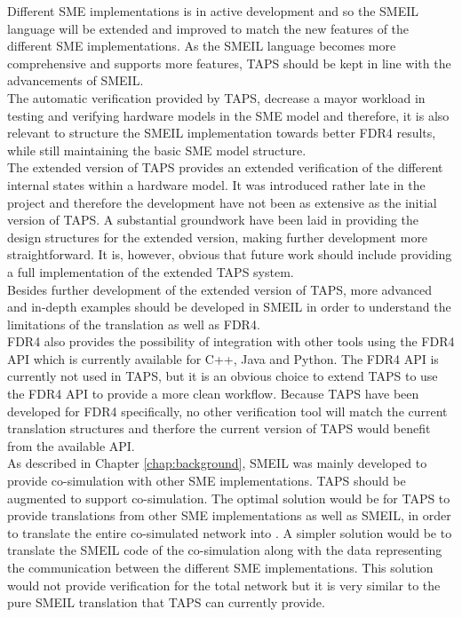 
Different SME implementations is in active development and so the SMEIL language will be extended and improved to match the new features of the different SME implementations. As the SMEIL language becomes more comprehensive and supports more features, TAPS should be kept in line with the advancements of SMEIL.\\
The automatic verification provided by TAPS, decrease a mayor workload in testing and verifying hardware models in the SME model and therefore, it is also relevant to structure the SMEIL implementation towards better FDR4 results, while still maintaining the basic SME model structure. \\

The extended version of TAPS provides an extended verification of the different internal states within a hardware model. It was introduced rather late in the project and therefore the development have not been as extensive as the initial version of TAPS. A substantial groundwork have been laid in providing the design structures for the extended version, making further development more straightforward. It is, however, obvious that future work should include providing a full implementation of the extended TAPS system. \\

Besides further development of the extended version of TAPS, more advanced and in-depth examples should be developed in SMEIL in order to understand the limitations of the translation as well as FDR4.\\


FDR4 also provides the possibility of integration with other tools using the FDR4 API which is currently available for C++, Java and Python. The FDR4 API is currently not used in TAPS, but it is an obvious choice to extend TAPS to use the FDR4 API to provide a more clean workflow. Because TAPS have been developed for FDR4 specifically, no other verification tool will match the current translation structures and therfore the current version of TAPS would benefit from the available API.\\

As described in Chapter \ref{chap:background}, SMEIL was mainly developed to provide co-simulation with other SME implementations. TAPS should be augmented to support co-simulation. The optimal solution would be for TAPS to provide translations from other SME implementations as well as SMEIL, in order to translate the entire co-simulated network into \cspm{}. A simpler solution would be to translate the SMEIL code of the co-simulation along with the data representing the communication between the different SME implementations. This solution would not provide verification for the total network but it is very similar to the pure SMEIL translation that TAPS can currently provide.\\


